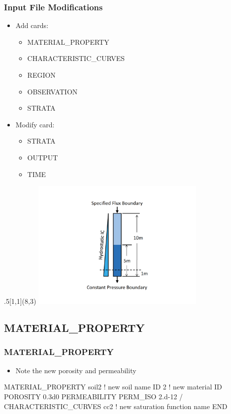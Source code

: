 \documentclass{beamer}
\newcommand\bluecomment[1]{{{\color{blue} #1}}}
\newcommand\magentacomment[1]{{{\color{magenta} #1}}}
\begin{document}
\begin{frame}[fragile]\frametitle{Input File Modifications}

\begin{itemize}
\item Add cards:
  \begin{itemize}
    \item MATERIAL\_PROPERTY
    \item CHARACTERISTIC\_CURVES
    \item REGION
    \item OBSERVATION
    \item STRATA
  \end{itemize}
\item Modify card:
  \begin{itemize}
    \item STRATA
    \item OUTPUT
    \item TIME
   \end{itemize}
\end{itemize}
\begin{textblock}{.5}[1,1](8,3)
\includegraphics[height=2.5in]{./vsat_flow_layered}
\end{textblock} 
\end{frame}


\subsection{MATERIAL\_PROPERTY}

\begin{frame}[fragile]\frametitle{MATERIAL\_PROPERTY}

\begin{itemize}
\item Note the new porosity and permeability
\end{itemize}

\begin{semiverbatim}
\magentacomment{
MATERIAL_PROPERTY soil2    \bluecomment{! new soil name}
  ID 2                     \bluecomment{! new material ID}
  POROSITY 0.3d0
  PERMEABILITY
    PERM_ISO 2.d-12
  /
  CHARACTERISTIC\_CURVES cc2  \bluecomment{! new saturation function name}
END}
\end{semiverbatim}

\end{frame}
\end{document}

